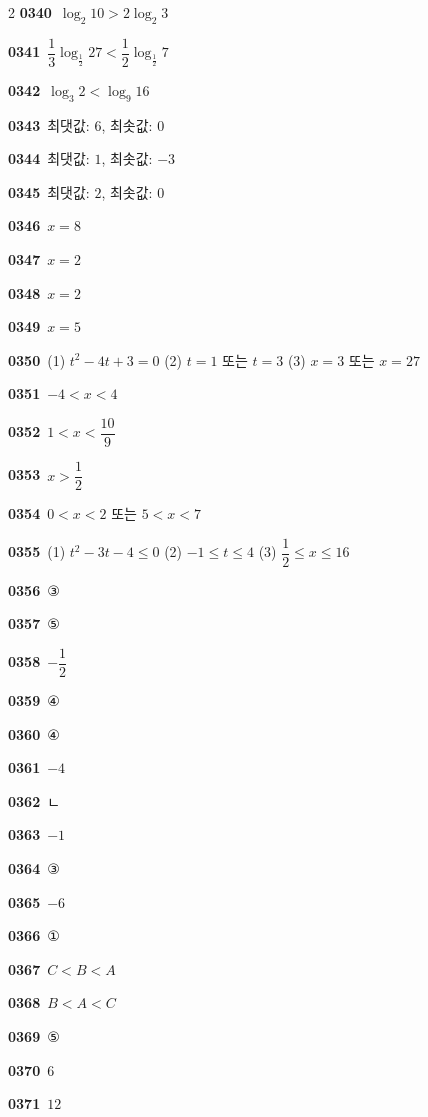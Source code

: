 \documentclass[10pt,a4paper]{article}
\begin{document}
\begin{multicols}{2}
\noindent\textbf{0340}\ $\log_2 10>2\log_2 3$\par
\noindent\textbf{0341}\ $\dfrac{1}{3}\log_{\frac{1}{2}} 27<\dfrac{1}{2}\log_{\frac{1}{2}} 7$\par
\noindent\textbf{0342}\ $\log_3 2<\log_9 16$\par
\noindent\textbf{0343}\ 최댓값: $6$, 최솟값: $0$\par
\noindent\textbf{0344}\ 최댓값: $1$, 최솟값: $-3$\par
\noindent\textbf{0345}\ 최댓값: $2$, 최솟값: $0$\par
\noindent\textbf{0346}\ $x=8$\par
\noindent\textbf{0347}\ $x=2$\par
\noindent\textbf{0348}\ $x=2$\par
\noindent\textbf{0349}\ $x=5$\par
\noindent\textbf{0350}\ (1) $t^2-4t+3=0$ (2) $t=1$ 또는 $t=3$ (3) $x=3$ 또는 $x=27$\par
\noindent\textbf{0351}\ $-4<x<4$\par
\noindent\textbf{0352}\ $1<x<\dfrac{10}{9}$\par
\noindent\textbf{0353}\ $x>\dfrac{1}{2}$\par
\noindent\textbf{0354}\ $0<x<2$ 또는 $5<x<7$\par
\noindent\textbf{0355}\ (1) $t^2-3t-4\le 0$ (2) $-1\le t\le 4$ (3) $\dfrac{1}{2}\le x\le 16$\par
\noindent\textbf{0356}\ ③\par
\noindent\textbf{0357}\ ⑤\par
\noindent\textbf{0358}\ $-\dfrac{1}{2}$\par
\noindent\textbf{0359}\ ④\par
\noindent\textbf{0360}\ ④\par
\noindent\textbf{0361}\ $-4$\par
\noindent\textbf{0362}\ ㄴ\par
\noindent\textbf{0363}\ $-1$\par
\noindent\textbf{0364}\ ③\par
\noindent\textbf{0365}\ $-6$\par
\noindent\textbf{0366}\ ①\par
\noindent\textbf{0367}\ $C<B<A$\par
\noindent\textbf{0368}\ $B<A<C$\par
\noindent\textbf{0369}\ ⑤\par
\noindent\textbf{0370}\ $6$\par
\noindent\textbf{0371}\ $12$\par

\end{multicols}
\end{document}
